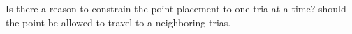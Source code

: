 Is there a reason to constrain the point placement to one tria at a time? should the point be allowed to travel to a neighboring trias.
